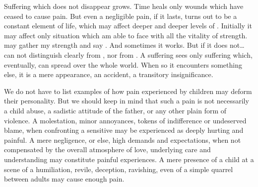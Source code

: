 Suffering which does not disappear grows.  Time heals only wounds which have
ceased to cause pain.  But even a negligible pain, if it lasts, turns out to be
a constant element of  life, which may affect deeper and deeper levels of
.  Initially it may affect only  situation which
 am able to face with all the vitality of  strength. 
may gather my strength and say . And sometimes
it works.  But if it does not\ldots {} can not distinguish clearly  from , nor  from . A suffering
 sees only suffering which, eventually, can spread over the whole world.
When so it encounters something else, it is a mere appearance, an accident, a
transitory insignificance.

\pa We do not have to list examples of how pain experienced by children may
deform their personality.  But we should keep in mind that such a pain is not
necessarily a child abuse, a sadistic attitude of the father, or any other plain
form of violence.  A molestation, minor annoyances, tokens of indifference or
undeserved blame, when confronting a sensitive  may be experienced as
deeply hurting and painful.  A mere negligence, or else, high demands and
expectations, when not compensated by the overall atmosphere of love, underlying
care and understanding may constitute painful experiences. A mere presence of a
child at a scene of a humiliation, revile, deception, ravishing, even of a
simple quarrel between adults may cause enough pain.


